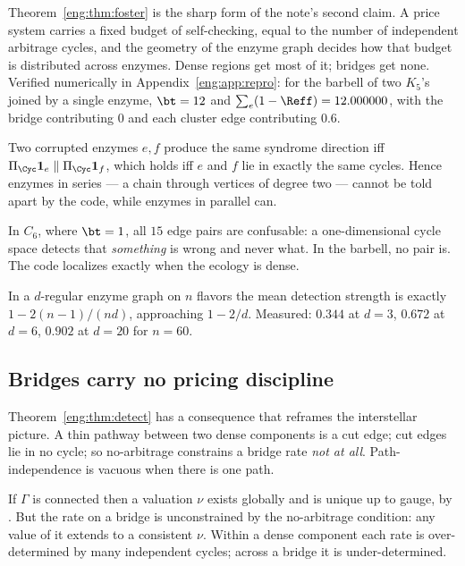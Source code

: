 Theorem~\ref{eng:thm:foster} is the sharp form of the note's second claim. A
price system carries a fixed budget of self-checking, equal to the number
of independent arbitrage cycles, and the geometry of the enzyme graph
decides how that budget is distributed across enzymes. Dense regions get
most of it; bridges get none. Verified numerically in
Appendix~\ref{eng:app:repro}: for the barbell of two $K_5$'s joined by a single
enzyme, $\bt = 12$ and $\sum_e(1-\Reff) = 12.000000$, with the bridge
contributing $0$ and each cluster edge contributing $0.6$.

\begin{proposition}\label{eng:prop:series}
Two corrupted enzymes $e, f$ produce the same syndrome direction iff
$\Pi_{\Cyc}\mathbf{1}_e \parallel \Pi_{\Cyc}\mathbf{1}_f$, which holds iff
$e$ and $f$ lie in exactly the same cycles. Hence enzymes in series --- a
chain through vertices of degree two --- cannot be told apart by the code,
while enzymes in parallel can.
\end{proposition}

In $C_6$, where $\bt = 1$, all $15$ edge pairs are confusable: a
one-dimensional cycle space detects that \emph{something} is wrong and
never what. In the barbell, no pair is. The code localizes exactly when the
ecology is dense.

\begin{corollary}\label{eng:cor:density}
In a $d$-regular enzyme graph on $n$ flavors the mean detection strength is
exactly $1 - 2(n-1)/(nd)$, approaching $1 - 2/d$. Measured: $0.344$ at
$d=3$, $0.672$ at $d=6$, $0.902$ at $d=20$ for $n=60$.
\end{corollary}

\subsection{Bridges carry no pricing discipline}\label{eng:S6.3}
\label{eng:sec:bridge}

Theorem~\ref{eng:thm:detect} has a consequence that reframes the interstellar
picture. A thin pathway between two dense components is a cut edge; cut
edges lie in no cycle; so no-arbitrage constrains a bridge rate \emph{not
at all}. Path-independence is vacuous when there is one path.

\begin{corollary}\label{eng:numeraire-global-but-uninformative}
If $\Gamma$ is connected then a valuation $\nu$ exists globally and is
unique up to gauge, by \cite[Thm.~3.3]{vtok}. But the rate on a bridge is
unconstrained by the no-arbitrage condition: any value of it extends to a
consistent $\nu$. Within a dense component each rate is over-determined by
many independent cycles; across a bridge it is under-determined.
\end{corollary}

